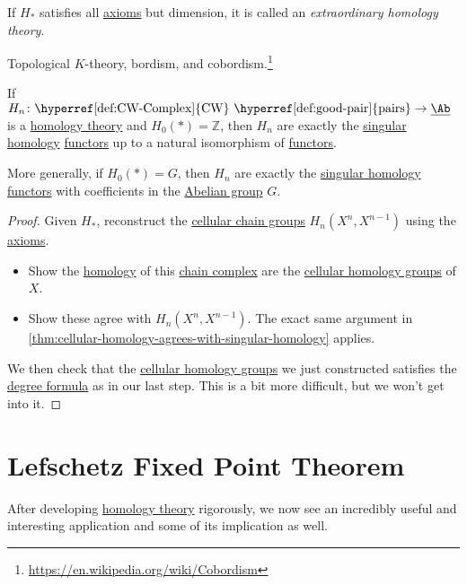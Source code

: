 \begin{definition}\label{def:extraordinary-homology-theory}
	If \(H_\ast\) satisfies all \hyperref[def:homology-theory]{axioms} but dimension, it is called an \emph{extraordinary homology theory}.
\end{definition}
\begin{eg}
	Topological \(K\)-theory, bordism, and cobordism.\footnote{\url{https://en.wikipedia.org/wiki/Cobordism}}
\end{eg}

\begin{theorem}\label{thm:characterization-of-singular-homology}
	If \(H_n \colon \text{\hyperref[def:CW-Complex]{CW} \hyperref[def:good-pair]{pairs}} \to \underline{\Ab}\) is a
	\hyperref[def:homology-theory]{homology theory} and \(H_0(\ast) = \mathbb{Z}\), then \(H_n\) are exactly
	the \hyperref[def:singular-homology-group]{singular homology} \hyperref[def:functor]{functors} up to a natural isomorphism of \hyperref[def:functor]{functors}.

	More generally, if \(H_0(\ast) = G\), then \(H_n\) are exactly the
	\hyperref[def:singular-homology-group]{singular homology} \hyperref[def:functor]{functors} with coefficients in the
	\hyperref[def:Abelian-group]{Abelian group} \(G\).
\end{theorem}
\begin{proof}
	Given \(H_\ast\), reconstruct the \hyperref[def:cellular-chain-complex]{cellular chain groups} \(H_n(X^n, X^{n-1})\) using the
	\hyperref[def:homology-theory]{axioms}.
	\begin{itemize}
		\item Show the \hyperref[def:homology-theory]{homology} of this \hyperref[def:chain-complex]{chain complex} are
		      the \hyperref[def:cellular-homology-group]{cellular homology groups} of \(X\).
		\item Show these agree with \(H_{n} (X^n, X^{n-1})\). The exact same argument in \autoref{thm:cellular-homology-agrees-with-singular-homology} applies.
	\end{itemize}

	We then check that the \hyperref[def:cellular-homology-group]{cellular homology groups} we just constructed satisfies the
	\hyperref[thm:calculation-with-local-degree]{degree formula} as in our last step. This is a bit more difficult, but we won't get into it.
\end{proof}

\chapter{Lefschetz Fixed Point Theorem}
After developing \hyperref[def:homology-theory]{homology theory} rigorously, we now see an incredibly useful and interesting application and some of its
implication as well.

